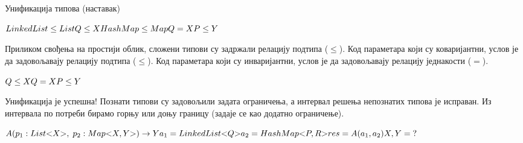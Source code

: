 \documentclass[xcolor=table]{beamer}
\begin{document}
\begin{frame}[allowframebreaks]{Унификација типова (наставак)}
        \framebreak
        
        \begin{math}
LinkedList \leq List
\newline
Q \leq X
\newline
HashMap \leq Map
\newline
Q = X
\newline
P \leq Y
\newline
        \end{math}
        
        Приликом свођења на простији облик, сложени типови су задржали релацију подтипа (\begin{math}\leq\end{math}).
        \newline\newline
        Код параметара који су коваријантни, услов је да задовољавају релацију подтипа (\begin{math}\leq\end{math}).
        \newline\newline
        Код параметара који су инваријантни, услов је да задовољавају релацију једнакости (\begin{math}=\end{math}).
        
        \framebreak
        
        \begin{math}
Q \leq X
\newline
Q = X
\newline
P \leq Y
\newline
        \end{math}
        
        Унификација је успешна!
        \newline\newline
        Познати типови су задовољили задата ограничења, а интервал решења непознатих типова је исправан.
        \newline\newline
        Из интервала по потреби бирамо горњу или доњу границу (задаје се као додатно ограничење).
        
        \framebreak
        
        \begin{math}
A(p_1: List\mathord{<}X\mathord{>},\;p_2: Map\mathord{<}X, Y\mathord{>})\to Y
\newline
a_1 = LinkedList\mathord{<}Q\mathord{>}
\newline
a_2 = HashMap\mathord{<}P, R\mathord{>}
\newline
\newline
res = A(a_1, a_2)
\newline
X, Y = \;?
        \end{math}
        

\end{frame}
\end{document}

